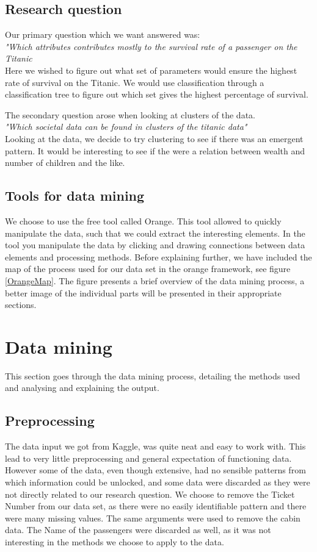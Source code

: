 \documentclass[a4paper,11pt]{article}
\begin{document}
\subsection{Research question}
Our primary question which we want answered was:\\
\textit{"Which attributes contributes mostly to the survival rate of a passenger on the Titanic}\\
Here we wished to figure out what set of parameters would ensure the highest rate of survival on the Titanic. We would use classification through a classification tree to figure out which set gives the highest percentage of survival.

The secondary question arose when looking at clusters of the data.\\
\textit{"Which societal data can be found in clusters of the titanic data"}\\
Looking at the data, we decide to try clustering to see if there was an emergent pattern. It would be interesting to see if the were a relation between wealth and number of children and the like. 
\subsection{Tools for data mining}
We choose to use the free tool called Orange\cite{orange}. This tool allowed to quickly manipulate the data, such that we could extract the interesting elements. 
In the tool you manipulate the data by clicking and drawing connections between data elements and processing methods. Before explaining further, we have included the map of the process used for our data set in the orange framework, see figure \ref{OrangeMap}. The figure presents a brief overview of the data mining process, a better image of the individual parts will be presented in their appropriate sections. 

\clearpage
\section{Data mining}
This section goes through the data mining process, detailing the methods used and analysing and explaining the output. 
\subsection{Preprocessing}
The data input we got from Kaggle\cite{kaggleData}, was quite neat and easy to work with. This lead to very little preprocessing and general expectation of functioning data. 
However some of the data, even though extensive, had no sensible patterns from which information could be unlocked, and some data were discarded as they were not directly related to our research question. 
We choose to remove the Ticket Number from our data set, as there were no easily identifiable pattern and there were many missing values. The same arguments were used to remove the cabin data. 
The Name of the passengers were discarded as well, as it was not interesting in the methods we choose to apply to the data. 
\end{document}
